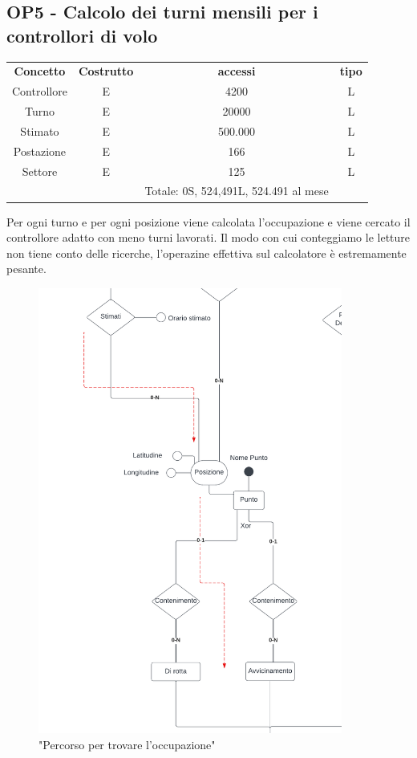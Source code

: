     \subsection*{OP5 - Calcolo dei turni mensili per i controllori di volo}
    \begin{table}[H]
    \centering
    \begin{tabular}{cccc}
  
    \rowcolor{tableheadercolor}
    \textbf{Concetto} & \textbf{Costrutto} & \textbf{accessi} & \textbf{tipo}\\
  
    Controllore & E & 4200 & L \\
    Turno & E & 20000 & L \\
    Stimato & E & 500.000 & L \\
    Postazione & E & 166 & L \\
    Settore & E & 125 & L \\
    & & Totale: 0S, 524,491L, 524.491 al mese &\\
  
    \end{tabular}
    \end{table}
    Per ogni turno e per ogni posizione viene calcolata l'occupazione e viene cercato il controllore adatto con meno turni lavorati.
    Il modo con cui conteggiamo le letture non tiene conto delle ricerche, l'operazine effettiva sul calcolatore è estremamente pesante.
    \begin{figure}[H]
      \centering
      \includegraphics[width=10cm]{figures/BasicControllerarrowsp1.pdf}
      \caption{"Percorso per trovare l'occupazione"}
    \end{figure}
